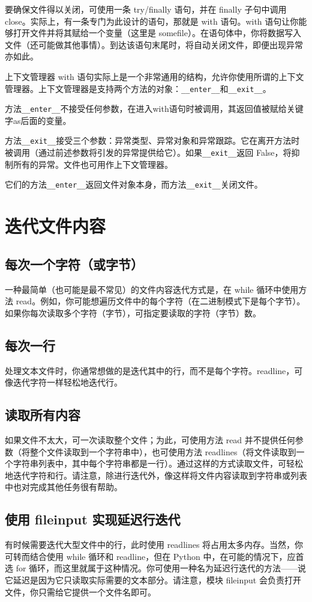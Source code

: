 要确保文件得以关闭，可使用一条 try/finally 语句，并在 finally 子句中调用 close。实际上，有一条专门为此设计的语句，那就是 with 语句。with 语句让你能够打开文件并将其赋给一个变量（这里是 somefile）。在语句体中，你将数据写入文件（还可能做其他事情）。到达该语句末尾时，将自动关闭文件，即便出现异常亦如此。

\begin{tcolorbox}[title=上下文管理器]
    上下文管理器 with 语句实际上是一个非常通用的结构，允许你使用所谓的上下文管理器。上下文管理器是支持两个方法的对象：\verb|__enter__|和\verb|__exit__|。

    方法\verb|__enter__|不接受任何参数，在进入with语句时被调用，其返回值被赋给关键字as后面的变量。

    方法\verb|__exit__|接受三个参数：异常类型、异常对象和异常跟踪。它在离开方法时被调用（通过前述参数将引发的异常提供给它）。如果\verb|__exit__|返回 False，将抑制所有的异常。文件也可用作上下文管理器。

    它们的方法\verb|__enter__|返回文件对象本身，而方法\verb|__exit__|关闭文件。
\end{tcolorbox}

\section{迭代文件内容}
\subsection{每次一个字符（或字节）}
一种最简单（也可能是最不常见）的文件内容迭代方式是，在 while 循环中使用方法 read。例如，你可能想遍历文件中的每个字符（在二进制模式下是每个字节）。如果你每次读取多个字符（字节），可指定要读取的字符（字节）数。
\subsection{每次一行}
处理文本文件时，你通常想做的是迭代其中的行，而不是每个字符。readline，可像迭代字符一样轻松地迭代行。
\subsection{读取所有内容}
如果文件不太大，可一次读取整个文件；为此，可使用方法 read 并不提供任何参数（将整个文件读取到一个字符串中），也可使用方法 readlines（将文件读取到一个字符串列表中，其中每个字符串都是一行）。通过这样的方式读取文件，可轻松地迭代字符和行。请注意，除进行迭代外，像这样将文件内容读取到字符串或列表中也对完成其他任务很有帮助。
\subsection{使用 fileinput 实现延迟行迭代}
有时候需要迭代大型文件中的行，此时使用 readlines 将占用太多内存。当然，你可转而结合使用 while 循环和 readline，但在 Python 中，在可能的情况下，应首选 for 循环，而这里就属于这种情况。你可使用一种名为延迟行迭代的方法——说它延迟是因为它只读取实际需要的文本部分。请注意，模块 fileinput 会负责打开文件，你只需给它提供一个文件名即可。
